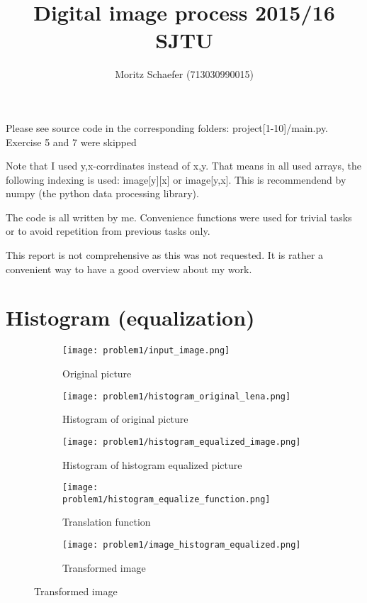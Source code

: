 \documentclass[a4paper]{scrartcl}
\author{Moritz Schaefer (713030990015)}
\title{Digital image process 2015/16 SJTU}
\begin{document}
\maketitle

Please see source code in the corresponding folders: project[1-10]/main.py.
Exercise 5 and 7 were skipped

Note that I used y,x-corrdinates instead of x,y. That means in all used arrays, the following indexing is used: image[y][x] or image[y,x]. This is recommendend by numpy (the python data processing library).

The code is all written by me. Convenience functions were used for trivial tasks or to avoid repetition from previous tasks only.

This report is not comprehensive as this was not requested. It is rather a convenient way to have a good overview about my work.

\section{Histogram (equalization)}

\begin{figure}[H]
  \caption{Histogram equalization}
  \centering
  \begin{subfigure}[t]{0.3\textwidth}
    \texttt{[image: problem1/input\_image.png]}
    \caption{Original picture}
  \end{subfigure}
  \begin{subfigure}[t]{0.3\textwidth}
    \centering
    \texttt{[image: problem1/histogram\_original\_lena.png]}
    \caption{Histogram of original picture}
  \end{subfigure}
  \begin{subfigure}[t]{0.3\textwidth}
    \centering
    \texttt{[image: problem1/histogram\_equalized\_image.png]}
    \caption{Histogram of histogram equalized picture}
  \end{subfigure}
  \begin{subfigure}[t]{0.3\textwidth}
    \centering
    \texttt{[image: problem1/histogram\_equalize\_function.png]}
    \caption{Translation function}
  \end{subfigure}
  \begin{subfigure}[t]{0.3\textwidth}
    \centering
    \texttt{[image: problem1/image\_histogram\_equalized.png]}
    \caption{Transformed image}
  \end{subfigure}
\end{figure}
\end{document}
